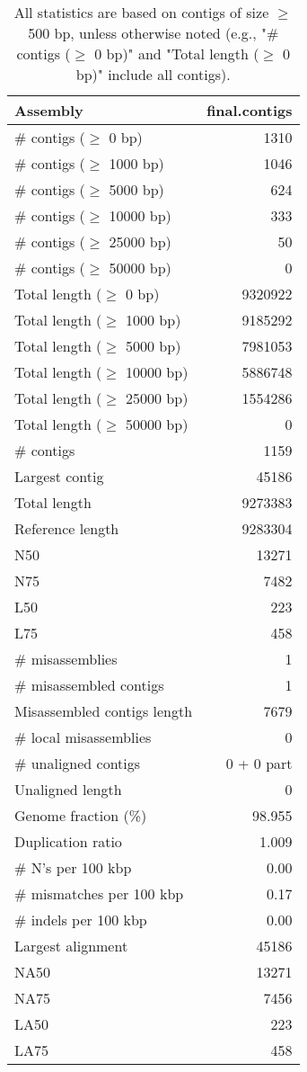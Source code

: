 \documentclass[12pt,a4paper]{article}
\begin{document}
\begin{table}[ht]
\begin{center}
\caption{All statistics are based on contigs of size $\geq$ 500 bp, unless otherwise noted (e.g., "\# contigs ($\geq$ 0 bp)" and "Total length ($\geq$ 0 bp)" include all contigs).}
\begin{tabular}{|l*{1}{|r}|}
\hline
Assembly & final.contigs \\ \hline
\# contigs ($\geq$ 0 bp) & 1310 \\ \hline
\# contigs ($\geq$ 1000 bp) & 1046 \\ \hline
\# contigs ($\geq$ 5000 bp) & 624 \\ \hline
\# contigs ($\geq$ 10000 bp) & 333 \\ \hline
\# contigs ($\geq$ 25000 bp) & 50 \\ \hline
\# contigs ($\geq$ 50000 bp) & 0 \\ \hline
Total length ($\geq$ 0 bp) & 9320922 \\ \hline
Total length ($\geq$ 1000 bp) & 9185292 \\ \hline
Total length ($\geq$ 5000 bp) & 7981053 \\ \hline
Total length ($\geq$ 10000 bp) & 5886748 \\ \hline
Total length ($\geq$ 25000 bp) & 1554286 \\ \hline
Total length ($\geq$ 50000 bp) & 0 \\ \hline
\# contigs & 1159 \\ \hline
Largest contig & 45186 \\ \hline
Total length & 9273383 \\ \hline
Reference length & 9283304 \\ \hline
N50 & 13271 \\ \hline
N75 & 7482 \\ \hline
L50 & 223 \\ \hline
L75 & 458 \\ \hline
\# misassemblies & 1 \\ \hline
\# misassembled contigs & 1 \\ \hline
Misassembled contigs length & 7679 \\ \hline
\# local misassemblies & 0 \\ \hline
\# unaligned contigs & 0 + 0 part \\ \hline
Unaligned length & 0 \\ \hline
Genome fraction (\%) & 98.955 \\ \hline
Duplication ratio & 1.009 \\ \hline
\# N's per 100 kbp & 0.00 \\ \hline
\# mismatches per 100 kbp & 0.17 \\ \hline
\# indels per 100 kbp & 0.00 \\ \hline
Largest alignment & 45186 \\ \hline
NA50 & 13271 \\ \hline
NA75 & 7456 \\ \hline
LA50 & 223 \\ \hline
LA75 & 458 \\ \hline
\end{tabular}
\end{center}
\end{table}
\end{document}
